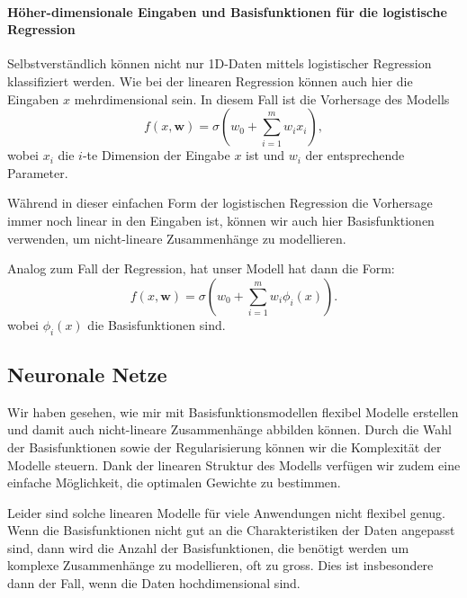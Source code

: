 

\paragraph{Höher-dimensionale Eingaben und Basisfunktionen für die logistische Regression}

Selbstverständlich können nicht nur 1D-Daten mittels logistischer Regression klassifiziert werden. Wie bei der linearen Regression können auch hier die Eingaben $x$ mehrdimensional sein. In diesem Fall ist die Vorhersage des Modells
\[
    f(x, \textbf{w}) = \sigma(w_0 + \sum_{i=1}^m w_i x_i),
\]
wobei $x_i$ die $i$-te Dimension der Eingabe $x$ ist und $w_i$ der entsprechende Parameter.

Während in dieser einfachen Form der logistischen Regression die Vorhersage immer noch linear in den Eingaben ist, können wir auch hier Basisfunktionen verwenden, um nicht-lineare Zusammenhänge zu modellieren.

Analog zum Fall der Regression, hat unser Modell hat dann die Form:
\[
    f(x, \textbf{w}) = \sigma(w_0 + \sum_{i=1}^m w_i \phi_i(x)).
\] 
wobei $\phi_i(x)$ die Basisfunktionen sind.

\subsection{Neuronale Netze}

Wir haben gesehen, wie mir mit Basisfunktionsmodellen flexibel Modelle erstellen und damit auch nicht-lineare Zusammenhänge abbilden können. Durch die Wahl der Basisfunktionen 
sowie der Regularisierung können wir die Komplexität der Modelle steuern. 
Dank der linearen Struktur des Modells verfügen wir zudem eine einfache Möglichkeit,
die optimalen Gewichte zu bestimmen. 

Leider sind solche linearen Modelle für viele Anwendungen nicht flexibel genug. 
Wenn die Basisfunktionen nicht gut an die Charakteristiken der Daten angepasst sind, dann 
wird die Anzahl der Basisfunktionen, die
benötigt werden um komplexe Zusammenhänge zu modellieren, oft zu gross. Dies ist insbesondere dann der Fall, 
wenn die Daten hochdimensional sind.


